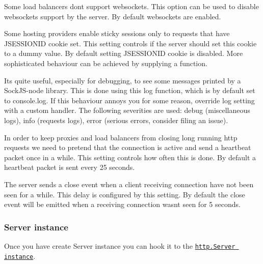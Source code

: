 \begin{DoxyDescription}
\item[websocket (boolean) ]Some load balancers don\textquotesingle{}t support websockets. This option can be used to disable websockets support by the server. By default websockets are enabled.


\item[jsessionid (boolean or function) ]Some hosting providers enable sticky sessions only to requests that have J\+S\+E\+S\+S\+I\+O\+N\+ID cookie set. This setting controls if the server should set this cookie to a dummy value. By default setting J\+S\+E\+S\+S\+I\+O\+N\+ID cookie is disabled. More sophisticated behaviour can be achieved by supplying a function.


\item[log (function(severity, message)) ]It\textquotesingle{}s quite useful, especially for debugging, to see some messages printed by a Sock\+J\+S-\/node library. This is done using this {\ttfamily log} function, which is by default set to {\ttfamily console.\+log}. If this behaviour annoys you for some reason, override {\ttfamily log} setting with a custom handler. The following {\ttfamily severities} are used\+: {\ttfamily debug} (miscellaneous logs), {\ttfamily info} (requests logs), {\ttfamily error} (serious errors, consider filing an issue).


\item[heartbeat\+\_\+delay (milliseconds) ]In order to keep proxies and load balancers from closing long running http requests we need to pretend that the connection is active and send a heartbeat packet once in a while. This setting controls how often this is done. By default a heartbeat packet is sent every 25 seconds. 


\item[disconnect\+\_\+delay (milliseconds) ]The server sends a {\ttfamily close} event when a client receiving connection have not been seen for a while. This delay is configured by this setting. By default the {\ttfamily close} event will be emitted when a receiving connection wasn\textquotesingle{}t seen for 5 seconds.  
\end{DoxyDescription}

\subsubsection*{Server instance}

Once you have create {\ttfamily Server} instance you can hook it to the \href{http://nodejs.org/docs/v0.5.8/api/http.html#http.createServer}{\tt http.\+Server instance}.


